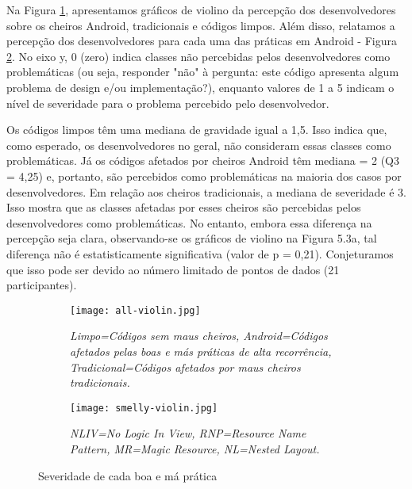 Na Figura \ref{fig:all-violin}, apresentamos gráficos de violino da percepção dos desenvolvedores sobre os cheiros Android, tradicionais e códigos limpos. Além disso, relatamos a percepção dos desenvolvedores para cada uma das práticas em Android - Figura \ref{fig:smelly-violin}. No eixo y, 0 (zero) indica classes não percebidas pelos desenvolvedores como problemáticas (ou seja, responder "não" à pergunta: este código apresenta algum problema de design e/ou implementação?), enquanto valores de 1 a 5 indicam o nível de severidade para o problema percebido pelo desenvolvedor.

Os códigos limpos têm uma mediana de gravidade igual a 1,5. Isso indica que, como esperado, os desenvolvedores no geral, não consideram essas classes como problemáticas. Já os códigos afetados por cheiros Android têm mediana = 2 (Q3 = 4,25) e, portanto, são percebidos como problemáticas na maioria dos casos por desenvolvedores. Em relação aos cheiros tradicionais, a mediana de severidade é 3. Isso mostra que as classes afetadas por esses cheiros são percebidas pelos desenvolvedores como problemáticas. No entanto, embora essa diferença na percepção seja clara, observando-se os gráficos de violino na Figura 5.3a, tal diferença não é estatisticamente significativa (valor de p = 0,21). Conjeturamos que isso pode ser devido ao número limitado de pontos de dados (21 participantes).

\begin{figure*}
\centering
\begin{subfigure}{.4\textwidth}
  \centering
  \texttt{[image: all-violin.jpg]}
  \caption{\footnotesize{\textit{Limpo=Códigos sem maus cheiros, Android=Códigos afetados pelas boas e más práticas de alta recorrência, Tradicional=Códigos afetados por maus cheiros tradicionais.}}}
  \label{fig:all-violin}
\end{subfigure}%
\hspace{5mm}
\begin{subfigure}{.4\textwidth}
  \centering
  \texttt{[image: smelly-violin.jpg]}
  \caption{\footnotesize{\textit{NLIV=No Logic In View, RNP=Resource Name Pattern, MR=Magic Resource, NL=Nested Layout.}}}
  \label{fig:smelly-violin}
\end{subfigure}
\caption{Severidade de cada boa e má prática}
\label{fig:test}
\end{figure*}

